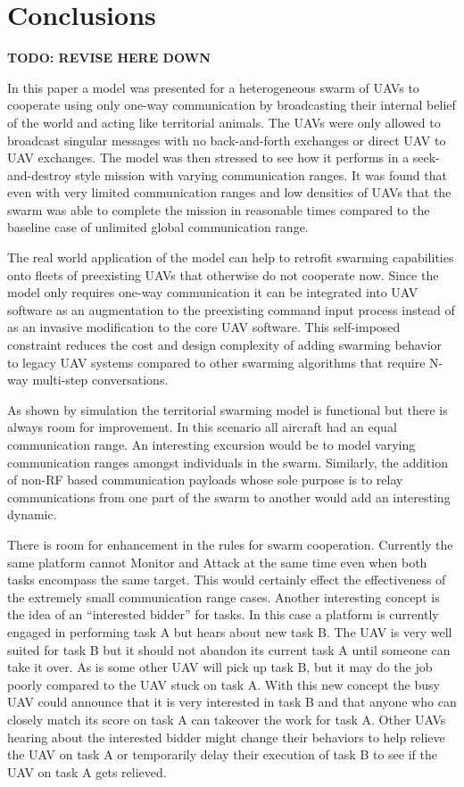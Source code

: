 \chapter{Conclusions}
\label{chap:conclusion}

\textbf{TODO: REVISE HERE DOWN}

In this paper a model was presented for a heterogeneous swarm of UAVs to cooperate using only one-way communication by broadcasting their internal belief of the world and acting like territorial animals.  The UAVs were only allowed to broadcast singular messages with no back-and-forth exchanges or direct UAV to UAV exchanges.  The model was then stressed to see how it performs in a seek-and-destroy style mission with varying communication ranges.  It was found that even with very limited communication ranges and low densities of UAVs that the swarm was able to complete the mission in reasonable times compared to the baseline case of unlimited global communication range.

The real world application of the model can help to retrofit swarming capabilities onto fleets of preexisting UAVs that otherwise do not cooperate now.  Since the model only requires one-way communication it can be integrated into UAV software as an augmentation to the preexisting command input process instead of as an invasive modification to the core UAV software. This self-imposed constraint reduces the cost and design complexity of adding swarming behavior to legacy UAV systems compared to other swarming algorithms that require N-way multi-step conversations.

As shown by simulation the territorial swarming model is functional but there is always room for improvement.  In this scenario all aircraft had an equal communication range.  An interesting excursion would be to model varying communication ranges amongst individuals in the swarm.  Similarly, the addition of non-RF based communication payloads whose sole purpose is to relay communications from one part of the swarm to another would add an interesting dynamic.

There is room for enhancement in the rules for swarm cooperation.  Currently the same platform cannot Monitor and Attack at the same time even when both tasks encompass the same target.  This would certainly effect the effectiveness of the extremely small communication range cases.  Another interesting concept is the idea of an ``interested bidder'' for tasks.  In this case a platform is currently engaged in performing task A but hears about new task B.  The UAV is very well suited for task B but it should not abandon its current task A until someone can take it over.  As is some other UAV will pick up task B, but it may do the job poorly compared to the UAV stuck on task A.  With this new concept the busy UAV could announce that it is very interested in task B and that anyone who can closely match its score on task A can takeover the work for task A.  Other UAVs hearing about the interested bidder might change their behaviors to help relieve the UAV on task A or temporarily delay their execution of task B to see if the UAV on task A gets relieved.

